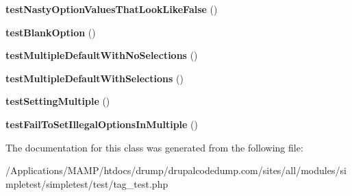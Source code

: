 \begin{DoxyCompactItemize}
\item 
\hypertarget{class_test_of_selection_a2460b8159845ce247793fae45b38074e}{
{\bfseries testNastyOptionValuesThatLookLikeFalse} ()}
\label{class_test_of_selection_a2460b8159845ce247793fae45b38074e}

\item 
\hypertarget{class_test_of_selection_a309e179f466259108da234ce5d7d8adf}{
{\bfseries testBlankOption} ()}
\label{class_test_of_selection_a309e179f466259108da234ce5d7d8adf}

\item 
\hypertarget{class_test_of_selection_ab99bf229eb053096f2034423cc3839f5}{
{\bfseries testMultipleDefaultWithNoSelections} ()}
\label{class_test_of_selection_ab99bf229eb053096f2034423cc3839f5}

\item 
\hypertarget{class_test_of_selection_a7bfbda3b2332bc4e13bb58fc1339a228}{
{\bfseries testMultipleDefaultWithSelections} ()}
\label{class_test_of_selection_a7bfbda3b2332bc4e13bb58fc1339a228}

\item 
\hypertarget{class_test_of_selection_a8d2bfacf81a594fa14493c4b32f8bda2}{
{\bfseries testSettingMultiple} ()}
\label{class_test_of_selection_a8d2bfacf81a594fa14493c4b32f8bda2}

\item 
\hypertarget{class_test_of_selection_a79cca002429886061c852ad3fa1e5b2d}{
{\bfseries testFailToSetIllegalOptionsInMultiple} ()}
\label{class_test_of_selection_a79cca002429886061c852ad3fa1e5b2d}

\end{DoxyCompactItemize}


The documentation for this class was generated from the following file:\begin{DoxyCompactItemize}
\item 
/Applications/MAMP/htdocs/drump/drupalcodedump.com/sites/all/modules/simpletest/simpletest/test/tag\_\-test.php\end{DoxyCompactItemize}
